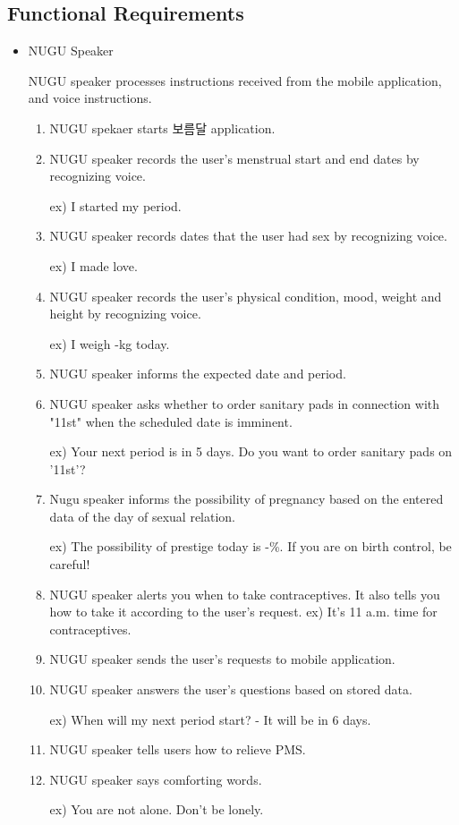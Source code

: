 \documentclass[conference]{IEEEtran}
\begin{document}
\subsection{Functional Requirements}
\begin{itemize}
\item NUGU Speaker

NUGU speaker processes instructions received from the mobile application, and voice instructions.
\begin{enumerate}
\item NUGU spekaer starts 보름달 application.
\item NUGU speaker records the user’s menstrual start and end dates by recognizing voice.

ex) I started my period.
\item NUGU speaker records dates that the user had sex by recognizing voice.

ex) I made love. 
\item NUGU speaker records the user's physical condition, mood, weight and height by recognizing voice.

ex) I weigh -kg today.
\item NUGU speaker informs the expected date and period. 
\item NUGU speaker asks whether to order sanitary pads in connection with  "11st" when the scheduled date is imminent.

ex) Your next period is in 5 days. Do you want to order sanitary pads on '11st'?
\item Nugu speaker informs the possibility of pregnancy based on the entered data of the day of sexual relation.

ex) The possibility of prestige today is -\%. If you are on birth control, be careful!
\item NUGU speaker alerts you when to take contraceptives. It also tells you how to take it according to the user's request.
ex) It's 11 a.m. time for contraceptives.

\item NUGU speaker sends the user's requests to mobile application.
\item NUGU speaker answers the user’s questions based on stored data.

ex) When will my next period start? - It will be in 6 days.
\item NUGU speaker tells users how to relieve PMS.
\item NUGU speaker says comforting words.

ex) You are not alone. Don’t be lonely.
\end{enumerate}
\end{itemize}
\end{document}
